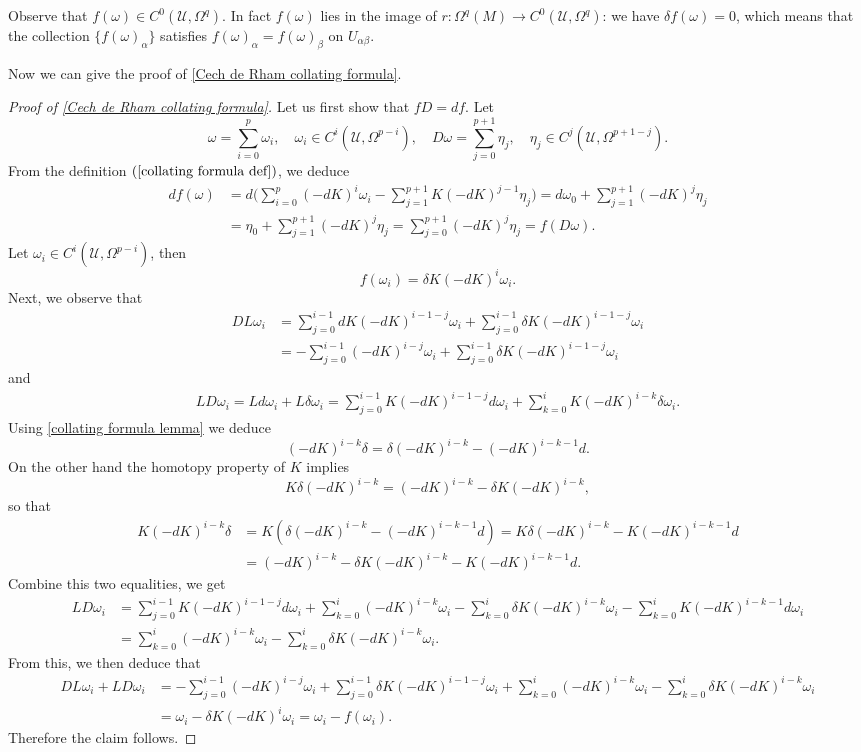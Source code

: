 Observe that $f(\omega)\in C^0(\mathcal{U},\Omega^q)$. In fact $f(\omega)$ lies in the image of $r:\Omega^q(M)\to C^0(\mathcal{U},\Omega^q)$: we have $\delta f(\omega)=0$, 
which means that the collection $\{f(\omega)_\alpha\}$ satisfies $f(\omega)_\alpha=f(\omega)_\beta$ on $U_{\alpha\beta}$.\par
Now we can give the proof of \cref{Cech de Rham collating formula}.
\begin{proof}[Proof of \cref{Cech de Rham collating formula}]
Let us first show that $fD=df$. Let
\[\omega=\sum_{i=0}^{p}\omega_i,\quad\omega_i\in C^i(\mathcal{U},\Omega^{p-i}),\quad D\omega=\sum_{j=0}^{p+1}\eta_j,\quad\eta_j\in C^{j}(\mathcal{U},\Omega^{p+1-j}).\]
From the definition $(\ref{collating formula def})$, we deduce
\begin{align*}
df(\omega)&=d\Big(\sum_{i=0}^{p}(-dK)^i\omega_i-\sum_{j=1}^{p+1}K(-dK)^{j-1}\eta_j\Big)=d\omega_0+\sum_{j=1}^{p+1}(-dK)^j\eta_j\\
&=\eta_0+\sum_{j=1}^{p+1}(-dK)^j\eta_j=\sum_{j=0}^{p+1}(-dK)^j\eta_j=f(D\omega).
\end{align*}
Let $\omega_i\in C^i(\mathcal{U},\Omega^{p-i})$, then
\[f(\omega_i)=\delta K(-dK)^i\omega_i.\]
Next, we observe that
\begin{align*}
DL\omega_i&=\sum_{j=0}^{i-1}dK(-dK)^{i-1-j}\omega_i+\sum_{j=0}^{i-1}\delta K(-dK)^{i-1-j}\omega_i\\
&=-\sum_{j=0}^{i-1}(-dK)^{i-j}\omega_i+\sum_{j=0}^{i-1}\delta K(-dK)^{i-1-j}\omega_i
\end{align*}
and
\begin{align*}
LD\omega_i=Ld\omega_i+L\delta\omega_i=\sum_{j=0}^{i-1}K(-dK)^{i-1-j}d\omega_i+\sum_{k=0}^{i}K(-dK)^{i-k}\delta\omega_i.
\end{align*}
Using \cref{collating formula lemma} we deduce
\[(-dK)^{i-k}\delta=\delta(-dK)^{i-k}-(-dK)^{i-k-1}d.\]
On the other hand the homotopy property of $K$ implies
\[K\delta(-dK)^{i-k}=(-dK)^{i-k}-\delta K(-dK)^{i-k},\]
so that
\begin{align*}
K(-dK)^{i-k}\delta&=K(\delta(-dK)^{i-k}-(-dK)^{i-k-1}d)=K\delta(-dK)^{i-k}-K(-dK)^{i-k-1}d\\
&=(-dK)^{i-k}-\delta K(-dK)^{i-k}-K(-dK)^{i-k-1}d.
\end{align*}
Combine this two equalities, we get
\begin{align*}
LD\omega_i&=\sum_{j=0}^{i-1}K(-dK)^{i-1-j}d\omega_i+\sum_{k=0}^{i}(-dK)^{i-k}\omega_i-\sum_{k=0}^{i}\delta K(-dK)^{i-k}\omega_i-\sum_{k=0}^{i}K(-dK)^{i-k-1}d\omega_i\\
&=\sum_{k=0}^{i}(-dK)^{i-k}\omega_i-\sum_{k=0}^{i}\delta K(-dK)^{i-k}\omega_i.
\end{align*}
From this, we then deduce that
\begin{align*}
DL\omega_i+LD\omega_i&=-\sum_{j=0}^{i-1}(-dK)^{i-j}\omega_i+\sum_{j=0}^{i-1}\delta K(-dK)^{i-1-j}\omega_i+\sum_{k=0}^{i}(-dK)^{i-k}\omega_i-\sum_{k=0}^{i}\delta K(-dK)^{i-k}\omega_i\\
&=\omega_i-\delta K(-dK)^i\omega_i=\omega_i-f(\omega_i).
\end{align*}
Therefore the claim follows.
\end{proof}
